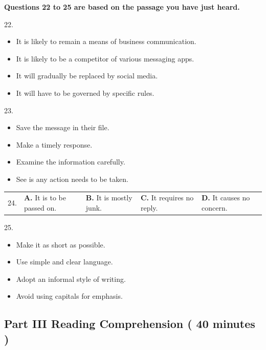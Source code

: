 \documentclass[UTF8,11pt]{ctexart}
\begin{document}
\textbf{Questions 22 to 25 are based on the passage you have just heard.}


22.


\begin{itemize}[leftmargin=2em,itemsep=.2em,topsep=.4em]\item[A.] It is likely to remain a means of business communication.
\item[B.] It is likely to be a competitor of various messaging apps.
\item[C.] It will gradually be replaced by social media.
\item[D.] It will have to be governed by specific rules.
\end{itemize}

23.


\begin{itemize}[leftmargin=2em,itemsep=.2em,topsep=.4em]\item[A.] Save the message in their file.
\item[B.] Make a timely response.
\item[C.] Examine the information carefully.
\item[D.] See is any action needs to be taken.
\end{itemize}

\noindent\begin{tabularx}{\linewidth}{@{}lXXXX@{}}24. & \textbf{A.} It is to be passed on. & \textbf{B.} It is mostly junk. & \textbf{C.} It requires no reply. & \textbf{D.} It causes no concern.\\\end{tabularx}\par

25.


\begin{itemize}[leftmargin=2em,itemsep=.2em,topsep=.4em]\item[A.] Make it as short as possible.
\item[B.] Use simple and clear language.
\item[C.] Adopt an informal style of writing.
\item[D.] Avoid using capitals for emphasis.
\end{itemize}

\subsection*{\textbf{Part} III \textbf{Reading Comprehension} \textbf{( 40 minutes )}}
\end{document}
